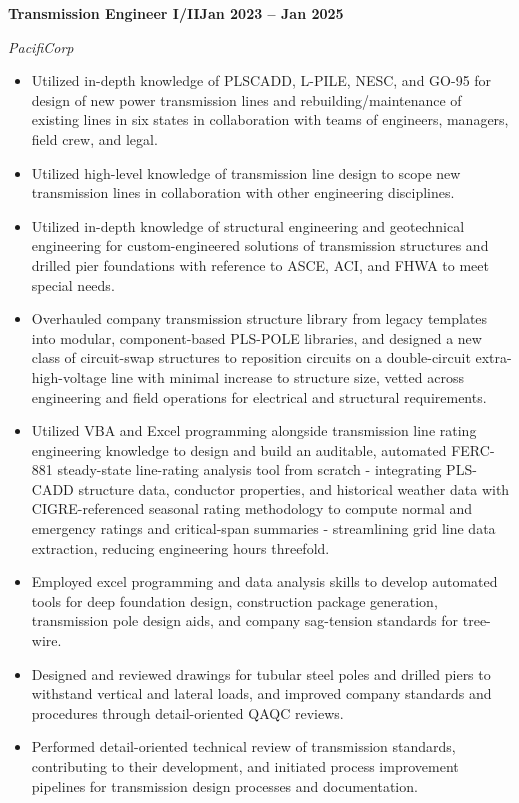 \documentclass[10pt, letterpaper]{article}
\newcommand{\jobline}[2]{%
  \vspace{5pt}%
  \noindent\textbf{#1}\hfill\textbf{#2}\par%
  \vspace{1pt}%
}
\newcommand{\subline}[1]{%
  \vspace{-1pt}%
  \noindent\textit{#1}\par%
  \vspace{1pt}%
}
\newenvironment{rlist}{%
  \begin{itemize}[leftmargin=1.4em, itemsep=1pt, topsep=2pt, parsep=0pt]%
}{%
  \end{itemize}%
}
\begin{document}
\jobline{Transmission Engineer I/II}{Jan 2023 -- Jan 2025}
\subline{PacifiCorp}
\begin{rlist}
  \item Utilized in-depth knowledge of PLSCADD, L-PILE, NESC, and GO-95 for design of new power transmission lines and rebuilding/maintenance of existing lines in six states in collaboration with teams of engineers, managers, field crew, and legal.
  \item Utilized high-level knowledge of transmission line design to scope new transmission lines in collaboration with other engineering disciplines.
  \item Utilized in-depth knowledge of structural engineering and geotechnical engineering for custom-engineered solutions of transmission structures and drilled pier foundations with reference to ASCE, ACI, and FHWA to meet special needs.
  \item Overhauled company transmission structure library from legacy templates into modular, component-based PLS-POLE libraries, and designed a new class of circuit-swap structures to reposition circuits on a double-circuit extra-high-voltage line with minimal increase to structure size, vetted across engineering and field operations for electrical and structural requirements.
  \item Utilized VBA and Excel programming alongside transmission line rating engineering knowledge to design and build an auditable, automated FERC-881 steady-state line-rating analysis tool from scratch - integrating PLS-CADD structure data, conductor properties, and historical weather data with CIGRE-referenced seasonal rating methodology to compute normal and emergency ratings and critical-span summaries - streamlining grid line data extraction, reducing engineering hours threefold.
  \item Employed excel programming and data analysis skills to develop automated tools for deep foundation design, construction package generation, transmission pole design aids, and company sag-tension standards for tree-wire.
  \item Designed and reviewed drawings for tubular steel poles and drilled piers to withstand vertical and lateral loads, and improved company standards and procedures through detail-oriented QAQC reviews.
  \item Performed detail-oriented technical review of transmission standards, contributing to their development, and initiated process improvement pipelines for transmission design processes and documentation.
\end{rlist}
\end{document}
